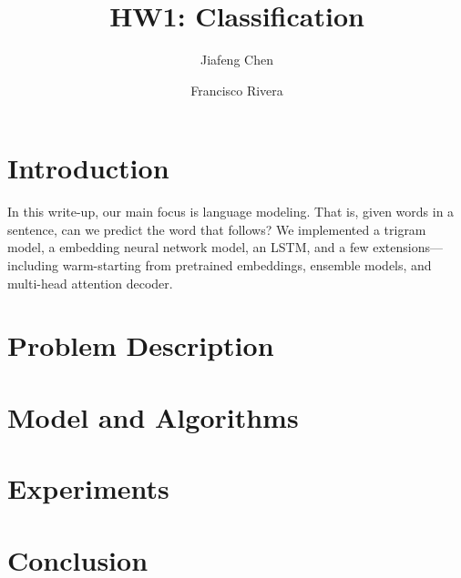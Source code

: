 \documentclass[12pt]{article}
\title{HW1: Classification}
\author{Jiafeng Chen \and
Francisco Rivera}
\begin{document}
\maketitle{}
\section{Introduction}
In this write-up, our main focus is language modeling. That is, given words in a
sentence, can we predict the word that follows? We implemented a trigram model,
a embedding neural network model, an LSTM, and a few extensions---including
warm-starting from pretrained embeddings, ensemble models, and multi-head
attention decoder. 

\section{Problem Description}
\section{Model and Algorithms}
\section{Experiments}
\section{Conclusion}




\end{document}
